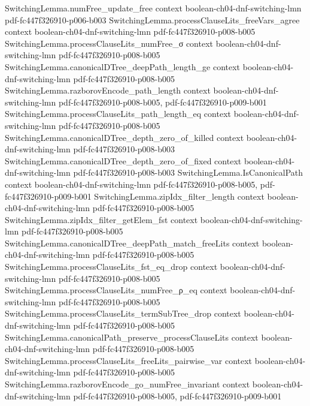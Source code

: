 \begin{theorem}
\proofstep
  {SwitchingLemma.numFree_update_free}
  {context}
  {boolean-ch04-dnf-switching-lmn}
  {pdf-fc447f326910-p006-b003}
\proofstep
  {SwitchingLemma.processClauseLits_freeVars_agree}
  {context}
  {boolean-ch04-dnf-switching-lmn}
  {pdf-fc447f326910-p008-b005}
\proofstep
  {SwitchingLemma.processClauseLits_numFree_σ}
  {context}
  {boolean-ch04-dnf-switching-lmn}
  {pdf-fc447f326910-p008-b005}
\proofstep
  {SwitchingLemma.canonicalDTree_deepPath_length_ge}
  {context}
  {boolean-ch04-dnf-switching-lmn}
  {pdf-fc447f326910-p008-b005}
\proofstep
  {SwitchingLemma.razborovEncode_path_length}
  {context}
  {boolean-ch04-dnf-switching-lmn}
  {pdf-fc447f326910-p008-b005,
    pdf-fc447f326910-p009-b001}
\proofstep
  {SwitchingLemma.processClauseLits_path_length_eq}
  {context}
  {boolean-ch04-dnf-switching-lmn}
  {pdf-fc447f326910-p008-b005}
\proofstep
  {SwitchingLemma.canonicalDTree_depth_zero_of_killed}
  {context}
  {boolean-ch04-dnf-switching-lmn}
  {pdf-fc447f326910-p008-b003}
\proofstep
  {SwitchingLemma.canonicalDTree_depth_zero_of_fixed}
  {context}
  {boolean-ch04-dnf-switching-lmn}
  {pdf-fc447f326910-p008-b003}
\proofstep
  {SwitchingLemma.IsCanonicalPath}
  {context}
  {boolean-ch04-dnf-switching-lmn}
  {pdf-fc447f326910-p008-b005,
    pdf-fc447f326910-p009-b001}
\proofstep
  {SwitchingLemma.zipIdx_filter_length}
  {context}
  {boolean-ch04-dnf-switching-lmn}
  {pdf-fc447f326910-p008-b005}
\proofstep
  {SwitchingLemma.zipIdx_filter_getElem_fst}
  {context}
  {boolean-ch04-dnf-switching-lmn}
  {pdf-fc447f326910-p008-b005}
\proofstep
  {SwitchingLemma.canonicalDTree_deepPath_match_freeLits}
  {context}
  {boolean-ch04-dnf-switching-lmn}
  {pdf-fc447f326910-p008-b005}
\proofstep
  {SwitchingLemma.processClauseLits_fst_eq_drop}
  {context}
  {boolean-ch04-dnf-switching-lmn}
  {pdf-fc447f326910-p008-b005}
\proofstep
  {SwitchingLemma.processClauseLits_numFree_ρ_eq}
  {context}
  {boolean-ch04-dnf-switching-lmn}
  {pdf-fc447f326910-p008-b005}
\proofstep
  {SwitchingLemma.processClauseLits_termSubTree_drop}
  {context}
  {boolean-ch04-dnf-switching-lmn}
  {pdf-fc447f326910-p008-b005}
\proofstep
  {SwitchingLemma.canonicalPath_preserve_processClauseLits}
  {context}
  {boolean-ch04-dnf-switching-lmn}
  {pdf-fc447f326910-p008-b005}
\proofstep
  {SwitchingLemma.processClauseLits_freeLits_pairwise_var}
  {context}
  {boolean-ch04-dnf-switching-lmn}
  {pdf-fc447f326910-p008-b005}
\proofstep
  {SwitchingLemma.razborovEncode_go_numFree_invariant}
  {context}
  {boolean-ch04-dnf-switching-lmn}
  {pdf-fc447f326910-p008-b005,
    pdf-fc447f326910-p009-b001}

\end{theorem}
